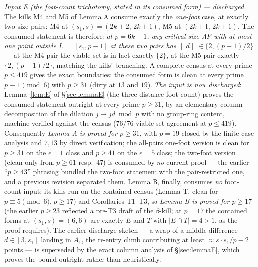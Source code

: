 \emph{Input E (the foot-count trichotomy, stated in its consumed form) ---
discharged.}
The kills M4 and M5 of Lemma A consume exactly the \emph{one-foot} case, at
exactly two size pairs: M4 at $(s_1,s)=(2k{+}2,\,2k{+}1)$, M5 at
$(2k{+}1,\,2k{+}1)$. The consumed statement is therefore: \emph{at
$p=6k+1$, any critical-size AP with at most one point outside
$I_1=[s_1,p-1]$ at these two pairs has $\|d\|\in\{2,(p{-}1)/2\}$} --- at
the M4 pair the viable set is in fact exactly $\{2\}$, at the M5 pair
exactly $\{2,(p{-}1)/2\}$, matching the kills' branching. A complete
census at every prime $p\le419$ gives the exact boundaries: the consumed
form is clean at every prime $p\equiv1\pmod6$ with $p\ge31$ (dirty at $13$
and $19$). \emph{The input is now discharged}: Lemma~\ref{lem:E} of
\S\ref{sec:lemmaE} (the three-distance foot count) proves the consumed
statement outright at every prime $p\ge31$, by an elementary column
decomposition of the dilation $j\mapsto jd\bmod p$ with no group-ring
content, machine-verified against the census ($76$/$76$ viable-set
agreement at $p\le419$). Consequently \emph{Lemma A is proved for
$p\ge31$}, with $p=19$ closed by the finite case analysis and $7,13$ by
direct verification; the all-pairs one-foot version is clean for $p\ge31$
on the $\epsilon=1$ class and $p\ge41$ on the $\epsilon=5$ class; the two-foot
version (clean only from $p\ge61$ resp.\ $47$) is consumed by \emph{no}
current proof --- the earlier ``$p\ge43$'' phrasing bundled the two-foot
statement with the pair-restricted one, and a previous revision separated
them. Lemma B, finally, consumes \emph{no} foot-count input: its kills run
on the contained census (Lemma T, clean for $p\equiv5\pmod6$, $p\ge17$) and
Corollaries T1--T3, so \emph{Lemma B is proved for $p\ge17$} (the earlier
$p\ge23$ reflected a pre-T3 draft of the $\beta$-kill; at $p=17$ the
contained forms at $(s_1,s)=(6,6)$ are exactly $E$ and $T$ with
$|E\cap T|=4>1$, as the proof requires). The earlier discharge sketch ---
a wrap of a middle difference $d\in[3,s_1]$ landing in $A_1$, the
re-entry climb contributing at least $\approx s\cdot s_1/p-2$ points ---
is superseded by the exact column analysis of \S\ref{sec:lemmaE}, which
proves the bound outright rather than heuristically.

